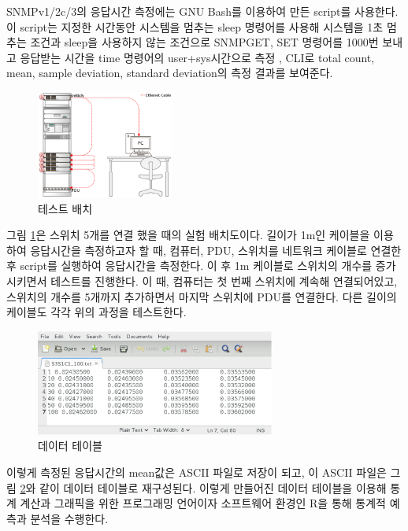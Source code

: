 \documentclass[11pt
  , a4paper
  , article
  , oneside
]{memoir}
\begin{document}
SNMPv1/2c/3의 응답시간 측정에는 GNU Bash를 이용하여 만든 script를 사용한다. 이 script는 지정한 시간동안 시스템을 멈추는 sleep 명령어를 사용해 시스템을 1초 멈추는 조건과 sleep을 사용하지 않는 조건으로 SNMPGET, SET 명령어를 1000번 보내고 응답받는 시간을 time 명령어의 user+sys시간으로 측정 , CLI로 total count, mean, sample deviation, standard deviation의 측정 결과를 보여준다.

\begin{figure}[!htb]
  \centering
  \includegraphics[width=0.4\textwidth]{./images/switch5.eps}
  \caption{테스트 배치}
  \label{fig:switch}   
\end{figure}

그림  \ref{fig:switch}은 스위치 5개를 연결 했을 때의 실험 배치도이다. 길이가 1m인 케이블을 이용하여 응답시간을 측정하고자 할 때, 컴퓨터, PDU, 스위치를 네트워크 케이블로 연결한 후 script를 실행하여 응답시간을 측정한다. 이 후 1m 케이블로 스위치의 개수를 증가시키면서 테스트를 진행한다. 이 때, 컴퓨터는 첫 번째 스위치에 계속해 연결되어있고, 스위치의 개수를 5개까지 추가하면서 마지막 스위치에 PDU를 연결한다. 다른 길이의 케이블도 각각 위의 과정을 테스트한다. 

\begin{figure}[!htb]
  \centering
  \includegraphics[width=0.7\textwidth]{./images/timetable.eps}
  \caption{데이터 테이블}
  \label{fig:time_table}   
\end{figure}

이렇게 측정된 응답시간의 mean값은 ASCII 파일로 저장이 되고, 이 ASCII 파일은 그림 \ref{fig:time_table}와 같이 데이터 테이블로 재구성된다. 이렇게 만들어진 데이터 테이블을 이용해 통계 계산과 그래픽을 위한 프로그래밍 언어이자 소프트웨어 환경인 R\citep{r}을 통해 통계적 예측과 분석을 수행한다. 
\end{document}
